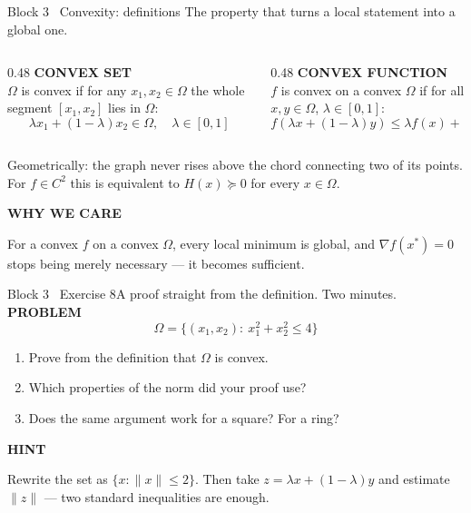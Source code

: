 \documentclass[aspectratio=169,11pt]{beamer}
\newcommand{\kicker}[1]{{\color{hseaccent}\scriptsize\bfseries\MakeUppercase{#1}}}
\newcommand{\takeaway}[2]{%
  \par\smallskip\noindent
  \colorbox{hselight}{\parbox{\dimexpr\textwidth-2\fboxsep}{%
    \kicker{#1}\par\vspace{0.12em}\footnotesize #2}}\par}
\begin{document}
\begin{frame}{Block 3 \textperiodcentered\ Convexity: definitions}
  {The property that turns a local statement into a global one.}
  \vspace{0.4em}
  \begin{columns}[T,onlytextwidth]
    \begin{column}{0.48\textwidth}
      \kicker{convex set}\\[0.3em]
      {\small $\Omega$ is convex if for any $x_1,x_2\in\Omega$ the whole segment $[x_1,x_2]$ lies in $\Omega$:}
      \[ \lambda x_1+(1-\lambda)x_2\in\Omega,\quad \lambda\in[0,1] \]
    \end{column}
    \begin{column}{0.48\textwidth}
      \kicker{convex function}\\[0.3em]
      {\small $f$ is convex on a convex $\Omega$ if for all $x,y\in\Omega$, $\lambda\in[0,1]$:}
      \[ f(\lambda x+(1-\lambda)y)\le \lambda f(x)+(1-\lambda)f(y) \]
    \end{column}
  \end{columns}
  \vspace{0.6em}
  {\small Geometrically: the graph never rises above the chord connecting two of its points.
    For $f\in C^2$ this is equivalent to $H(x)\succeq 0$ for every $x\in\Omega$.}
  \vspace{0.6em}
  \takeaway{why we care}{For a convex $f$ on a convex $\Omega$, every local minimum is global, and
    $\nabla f(x^\ast)=0$ stops being merely necessary --- it becomes sufficient.}
\end{frame}

\begin{frame}{Block 3 \textperiodcentered\ Exercise 8}{A proof straight from the definition. Two minutes.}
  \vspace{0.6em}
  \kicker{problem}
  \[ \Omega=\{(x_1,x_2):\ x_1^{2}+x_2^{2}\le 4\} \]
  \vspace{-0.5em}
  \begin{enumerate}\small
    \item Prove from the definition that $\Omega$ is convex.
    \item Which properties of the norm did your proof use?
    \item Does the same argument work for a square? For a ring?
  \end{enumerate}
  \vspace{0.5em}
  \takeaway{hint}{Rewrite the set as $\{x:\|x\|\le2\}$. Then take $z=\lambda x+(1-\lambda)y$ and estimate
    $\|z\|$ --- two standard inequalities are enough.}
\end{frame}
\end{document}
